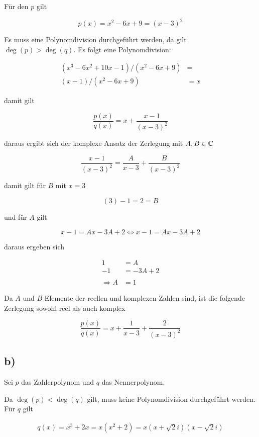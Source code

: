 \documentclass[a4paper, 11pt]{article}
\begin{document}
Für den \(p\) gilt

$$ p(x) = x^2 - 6x + 9 = (x - 3)^2 $$

Es muss eine Polynomdivision durchgeführt werden, da gilt \(\deg(p) > \deg(q)\).
Es folgt eine Polynomdivision:

\begin{align*}
    (x^3 - 6x^2 + 10x - 1) / (x^2 - 6x + 9) &= \\
    (x - 1) / (x^2 - 6x + 9) &= x 
\end{align*}

\pagebreak

damit gilt

$$ \frac{p(x)}{q(x)} = x + \frac{x - 1}{(x - 3)^2} $$

daraus ergibt sich der komplexe Ansatz der Zerlegung mit \(A, B \in \mathbb{C}\)

$$ \frac{x - 1}{(x - 3)^2} = \frac{A}{x - 3} + \frac{B}{(x - 3)^2} $$

damit gilt für \(B\) mit \(x = 3\)

$$ (3) - 1 = 2 = B $$

und für \(A\) gilt

$$ x - 1 = Ax - 3A + 2 \Leftrightarrow x - 1 = Ax - 3A + 2 $$

daraus ergeben sich

\begin{align*}
    1 &= A \\
    -1 &= -3A + 2 \\
    \\
    \Rightarrow A &= 1
\end{align*}

Da \(A\) und \(B\) Elemente der reellen und komplexen Zahlen sind, ist die folgende Zerlegung
sowohl reel als auch komplex

$$ \frac{p(x)}{q(x)} = x + \frac{1}{x - 3} + \frac{2}{(x - 3)^2} $$

\subsection{b)}
\label{sec:orge9b1c24}
Sei \(p\) das Zahlerpolynom und \(q\) das Nennerpolynom.

Da \(\deg(p) < \deg(q)\) gilt, muss keine Polynomdivision durchgeführt werden. \\
Für \(q\) gilt


\begin{align*}
    q(x) = x^3 + 2x = x(x^2 + 2) = x(x + \sqrt{2}i)(x - \sqrt{2}i)
\end{align*}
\end{document}
